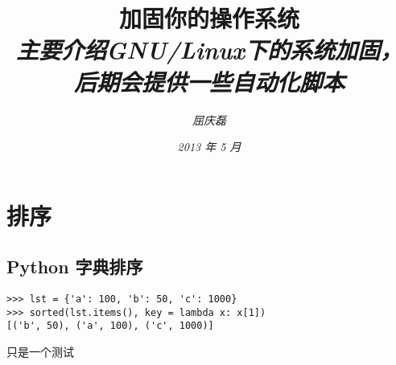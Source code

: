 \documentclass{article}
\begin{document}
\title{%
  {\huge \textsf{加固你的操作系统}\\\smallskip}%
  {\small \textit{主要介绍GNU/Linux下的系统加固，后期会提供一些自动化脚本}}
}

\author{\textit{屈庆磊}\\[2mm]
       }

\date{\textit{2013 年 5 月}}

\maketitle
\newpage
\begin{multicols}{2}
\tableofcontents
\end{multicols}
\newpage 

\section{排序}
\subsection{Python 字典排序}
\begin{verbatim}
>>> lst = {'a': 100, 'b': 50, 'c': 1000}
>>> sorted(lst.items(), key = lambda x: x[1])
[('b', 50), ('a', 100), ('c', 1000)]
\end{verbatim}
只是一个测试
\end{document}
